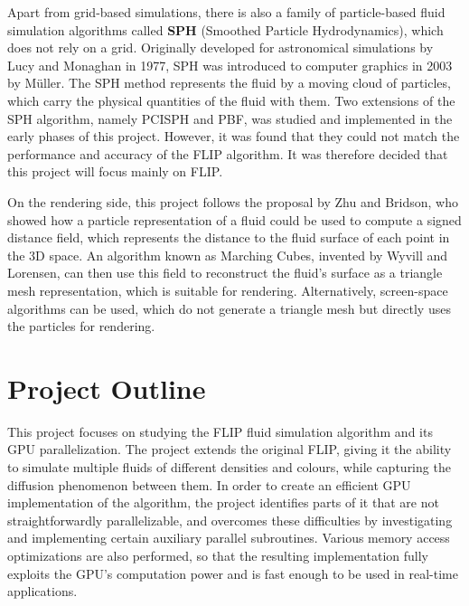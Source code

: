Apart from grid-based simulations, there is also a family of particle-based fluid simulation algorithms called \textbf{SPH} (Smoothed Particle Hydrodynamics), which does not rely on a grid. Originally developed for astronomical simulations by Lucy\cite{lucy1977numerical} and Monaghan\cite{monaghan1992smoothed} in 1977, SPH was introduced to computer graphics in 2003 by Müller\cite{muller2003particle}. The SPH method represents the fluid by a moving cloud of particles, which carry the physical quantities of the fluid with them. Two extensions of the SPH algorithm, namely PCISPH\cite{solenthaler2009predictive} and PBF\cite{macklin2013position}, was studied and implemented in the early phases of this project. However, it was found that they could not match the performance and accuracy of the FLIP algorithm. It was therefore decided that this project will focus mainly on FLIP.



On the rendering side, this project follows the proposal by Zhu and Bridson\cite{zhu2005animating}, who showed how a particle representation of a fluid could be used to compute a signed distance field, which represents the distance to the fluid surface of each point in the 3D space. An algorithm known as Marching Cubes, invented by Wyvill\cite{wyvill1986soft} and Lorensen\cite{lorensen1987marching}, can then use this field to reconstruct the fluid's surface as a triangle mesh representation, which is suitable for rendering. Alternatively, screen-space algorithms\cite{van2009screen} can be used, which do not generate a triangle mesh but directly uses the particles for rendering.



\section{Project Outline}


This project focuses on studying the FLIP fluid simulation algorithm and its GPU parallelization. The project extends the original FLIP, giving it the ability to simulate multiple fluids of different densities and colours, while capturing the diffusion phenomenon between them. In order to create an efficient GPU implementation of the algorithm, the project identifies parts of it that are not straightforwardly parallelizable, and overcomes these difficulties by investigating and implementing certain auxiliary parallel subroutines. Various memory access optimizations are also performed, so that the resulting implementation fully exploits the GPU's computation power and is fast enough to be used in real-time applications.

